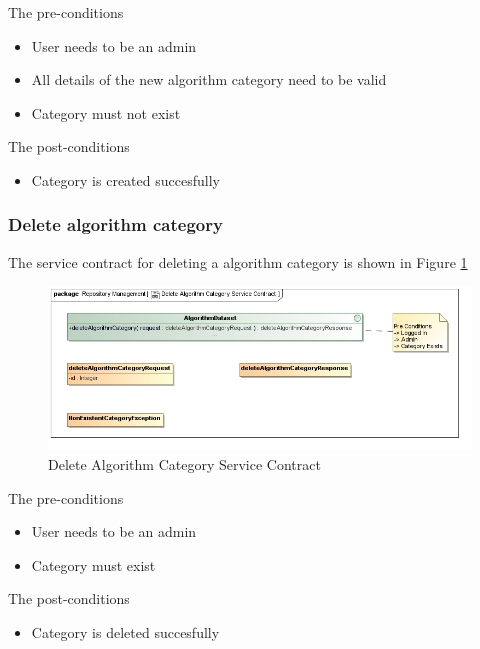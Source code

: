 The pre-conditions
\begin{itemize}
  \item User needs to be an admin
  \item All details of the new algorithm category need to be valid
  \item Category must not exist
\end{itemize}

The post-conditions
\begin{itemize}
  \item Category is created succesfully
\end{itemize}

\subsubsection {Delete algorithm category}

The service contract for deleting a algorithm category is shown in Figure \ref{fig:deleteAlgorithmCatService}
\begin{figure}[H]
  \begin{center}
  \includegraphics[scale=0.6]{../Diagrams and Charts/Test Data/Delete Algorithm Category Service Contract.jpg}
  \caption{Delete Algorithm Category Service Contract}
  \label{fig:deleteAlgorithmCatService}
  \end{center}
  
\end{figure}

The pre-conditions
\begin{itemize}
  \item User needs to be an admin
  \item Category must exist
\end{itemize}

The post-conditions
\begin{itemize}
  \item Category is deleted succesfully
\end{itemize}

